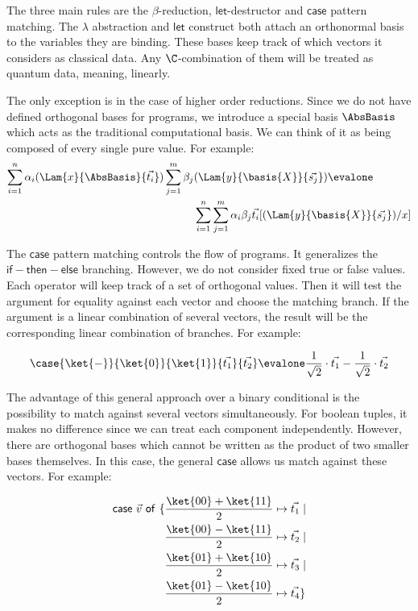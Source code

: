 The three main rules are the $\beta$-reduction, $\mathsf{let}$-destructor and $\mathsf{case}$ pattern matching. The $\lambda$ abstraction and $\mathsf{let}$ construct both attach an orthonormal basis to the variables they are binding. These bases keep track of which vectors it considers as classical data. Any $\C$-combination of them will be treated as quantum data, meaning, linearly. 

The only exception is in the case of higher order reductions. Since we do not have defined orthogonal bases for programs, we introduce a special basis $\AbsBasis$ which acts as the traditional computational basis. We can think of it as being composed of every single pure value. For example:
\begin{align*}
  \sum_{i=1}^{n}\alpha_i(\Lam{x}{\AbsBasis}{\vec{t_i}}) \sum_{j=1}^{m}\beta_j&(\Lam{y}{\basis{X}}{\vec{s_j}}) \evalone\\
  &\sum_{i=1}^n\sum_{j=1}^{m}\alpha_i\beta_j \vec{t_i}[(\Lam{y}{\basis{X}}{\vec{s_j}})/x]
\end{align*}

The $\mathsf{case}$ pattern matching controls the flow of programs. It generalizes the $\mathsf{if-then-else}$ branching. However, we do not consider fixed true or false values. Each operator will keep track of a set of orthogonal values. Then it will test the argument for equality against each vector and choose the matching branch. If the argument is a linear combination of several vectors, the result will be the corresponding linear combination of branches. For example:

\[
  \case{\ket{-}}{\ket{0}}{\ket{1}}{\vec{t_1}}{\vec{t_2}} \evalone
  \frac{1}{\sqrt{2}}\cdot\vec{t_1} - \frac{1}{\sqrt{2}}\cdot\vec{t_2}
\]

The advantage of this general approach over a binary conditional is the possibility to match against several vectors simultaneously. For boolean tuples, it makes no difference since we can treat each component independently. However, there are orthogonal bases which cannot be written as the product of two smaller bases themselves. In this case, the general $\mathsf{case}$ allows us match against these vectors. For example:

\begin{align*}
  \mathsf{case}\ \vec{v}\ \mathsf{of}\ \{ 
  &\frac{\ket{00} + \ket{11}}{2}\mapsto \vec{t_1} \mid\\
  &\frac{\ket{00} - \ket{11}}{2}\mapsto \vec{t_2} \mid\\
  &\frac{\ket{01} + \ket{10}}{2}\mapsto \vec{t_3} \mid\\
  &\frac{\ket{01} - \ket{10}}{2}\mapsto \vec{t_4} \}
\end{align*}

